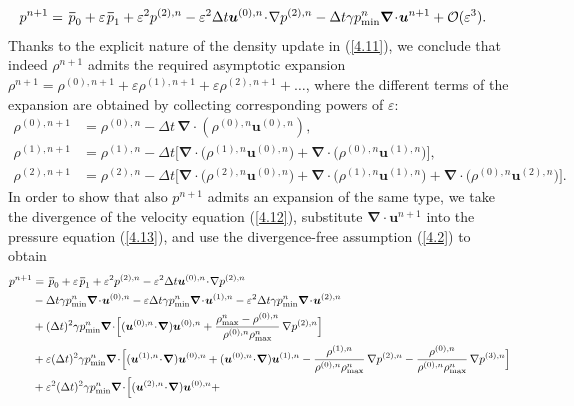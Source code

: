 \documentclass[A4paper,12pt,twoside]{article}
\newenvironment{proof}{{\flushleft \bf Proof:}}{}
\numberwithin{equation}{section}
\numberwithin{figure}{section}
\numberwithin{table}{section}
\def\muu {\bm{u}}
\def\bnabla{\bm{\nabla}}
\newcommand{\dt}{\Delta t}
\newcommand{\ve}{\varepsilon}
\newcommand\eref[1]{(\ref{#1})}
\newcommand*\xbar[1]{%
  \hbox{%
    \vbox{%
      \hrule height 0.5pt %
      \kern0.4ex%
      \hbox{%
        \kern-0.05em%
        \ensuremath{#1}%
        \kern-0.00em%
      }%
    }%
  }%
}
\begin{document}
\begin{proof}
\begin{align}
&p^{n+1}=\,\xbar p_0+\ve\,\xbar p_1+\ve^2 p^{(2),n}-\ve^2 \dt \bm u^{(0),n}\!\cdot\!\nabla p^{(2),n} -\dt\gamma p_{\min}^n\bnabla\!\cdot\!\bm u^{n+1}+{\cal O}(\ve^3).\label{4.13}
\end{align}
Thanks to the explicit nature of the density update in \eref{4.11}, we conclude that indeed $\rho^{n+1}$ admits the required asymptotic
expansion $\rho^{n+1}=\rho^{(0),n+1}+\ve\rho^{(1),n+1}+\ve\rho^{(2),n+1}+\dots$, where the different terms of the expansion are obtained by
collecting corresponding powers of $\ve$:
\begin{equation}
\begin{aligned}
\rho^{(0),n+1}&=\rho^{(0),n}-\dt\,\bnabla\!\cdot\!(\rho^{(0),n}\bm u^{(0),n}),\\
\rho^{(1),n+1}&=\rho^{(1),n}-\dt \big[\bnabla\!\cdot\!\big(\rho^{(1),n}\bm u^{(0),n}\big)+\bnabla\!\cdot\!\big(\rho^{(0),n}\bm u^{(1),n}\big)\big],\\
\rho^{(2),n+1}&=\rho^{(2),n}-\dt \big[\bnabla\!\cdot\!\big(\rho^{(2),n}\bm u^{(0),n}\big)+\bnabla\!\cdot\!\big(\rho^{(1),n}\bm u^{(1),n}\big)+\bnabla\!\cdot\!\big(\rho^{(0),n}\bm u^{(2),n}\big)\big].
\end{aligned}
\label{3.18}
\end{equation}
In order to show that also $p^{n+1}$ admits an expansion of the same type, we take the divergence of the velocity equation \eref{4.12},
substitute $\bnabla\!\cdot\!\muu^{n+1}$ into the pressure equation \eref{4.13}, and use the divergence-free assumption \eref{4.2} to obtain
$$
\begin{aligned}
p^{n+1}&=\,\xbar p_0+\ve\,\xbar p_1+\ve^2p^{(2),n}-\ve^2\dt\bm u^{(0),n}\!\cdot\!\nabla p^{(2),n}\\
&-\dt\gamma p_{\min}^n\bnabla\!\cdot\!\bm u^{(0),n}-\ve\dt\gamma p_{\min}^n\bnabla\!\cdot\!\bm u^{(1),n}-
\ve^2\dt\gamma p_{\min}^n\bnabla\!\cdot\!\bm u^{(2),n}\\
&+(\dt)^2\gamma p_{\min}^n\bnabla\!\cdot\!\Big[(\bm u^{(0),n}\!\cdot\!\bnabla)\bm u^{(0),n}+
\frac{\rho_{\max}^n-\rho^{(0),n}}{\rho^{(0),n}\rho_{\max}^n}\,\nabla p^{(2),n}\Big]\\
&+\ve(\dt)^2\gamma p_{\min}^n\bnabla\!\cdot\!\Big[(\bm u^{(1),n}\!\cdot\!\bnabla)\bm u^{(0),n}+(\bm u^{(0),n}\!\cdot\!\bnabla)\bm u^{(1),n}-
\frac{\rho^{(1),n}}{\rho^{(0),n}\rho_{\max}^n}\,\nabla p^{(2),n}-\frac{\rho^{(0),n}}{\rho^{(0),n}\rho_{\max}^n}\,\nabla p^{(3),n}\Big]\\
&+\ve^2 (\dt)^2\gamma p_{\min}^n\bnabla\!\cdot\!\Big[(\bm u^{(2),n}\!\cdot\!\bnabla)\bm u^{(0),n}+

\end{aligned}$$
\end{proof}
\end{document}
